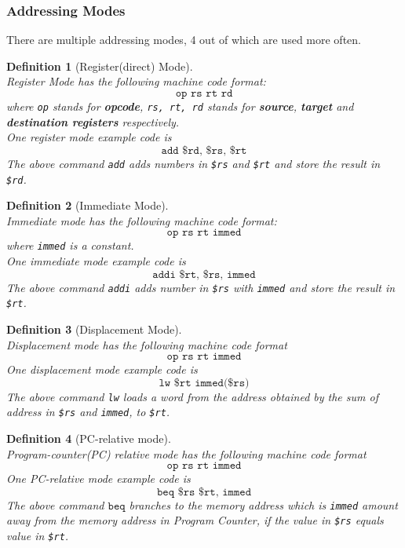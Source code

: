 \documentclass[12pt]{article}
\newtheorem{definition}{Definition}[section]
\theoremstyle{definition}
\begin{document}
\subsubsection{Addressing Modes}
There are multiple addressing modes, 4 out of which are used more often.
\begin{definition}[Register(direct) Mode]
\hfill\\\normalfont Register Mode has the following machine code format: \[\texttt{op rs rt rd}\] where \texttt{op} stands for \textbf{opcode}, \texttt{rs, rt, rd} stands for \textbf{source}, \textbf{target} and \textbf{destination registers} respectively.\\One register mode example code is \[\texttt{add \$rd, \$rs, \$rt}\] The above command \texttt{add} adds numbers in \texttt{\$rs} and \texttt{\$rt} and store the result in \texttt{\$rd}.
\end{definition}
\begin{definition}[Immediate Mode]
\hfill\\\normalfont Immediate mode has the following machine code format: \[\texttt{op rs rt immed}\] where \texttt{immed} is a constant.\\One immediate mode example code is\[\texttt{addi \$rt, \$rs, immed}\] The above command \texttt{addi} adds number in \texttt{\$rs} with \texttt{immed} and store the result in \texttt{\$rt}.
\end{definition}
\begin{definition}[Displacement Mode]
\hfill\\\normalfont Displacement mode has the following machine code format \[\texttt{op rs rt immed}\] One displacement mode example code is \[\texttt{lw \$rt immed(\$rs)}\]
The above command \texttt{lw} loads a word from the address obtained by the sum of address in \texttt{\$rs} and \texttt{immed}, to \texttt{\$rt}.
\end{definition}
\begin{definition}[PC-relative mode]
\hfill\\\normalfont Program-counter(PC) relative mode has the following machine code format \[\texttt{op rs rt immed}\] One PC-relative mode example code is \[\texttt{beq \$rs \$rt, immed}\] The above command $\texttt{beq}$ branches to the memory address which is \texttt{immed} amount away from the memory address in Program Counter, if the value in \texttt{\$rs} equals value in \texttt{\$rt}.
\end{definition}
\end{document}
